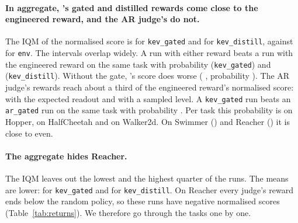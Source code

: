 \paragraph{In aggregate, \kev{}'s gated and distilled rewards come close to the engineered reward, and the AR judge's
do not.}
The IQM of the normalised score is   for
\texttt{kev\_gated} and   for
\texttt{kev\_distill}, against   for \texttt{env}. The intervals
overlap widely. A run with either reward beats a run with the engineered reward on the same task with probability
 (\texttt{kev\_gated}) and  (\texttt{kev\_distill}). Without the gate,
\kev{}'s score does worse ( , probability
). The AR judge's rewards reach about a third of the engineered reward's normalised score:
  with the expected readout and 
 with a sampled level. A \texttt{kev\_gated} run beats an
\texttt{ar\_gated} run on the same task with probability . Per task this probability is
 on Hopper,  on HalfCheetah and
 on Walker2d. On Swimmer () and Reacher
() it is close to even.

\paragraph{The aggregate hides Reacher.} The IQM leaves out the lowest and the highest quarter of the runs. The means
are lower:  for \texttt{kev\_gated} and  for \texttt{kev\_distill}. On Reacher
every judge's reward ends below the random policy, so these runs have negative normalised scores
(Table~\ref{tab:returns}). We therefore go through the tasks one by one.

